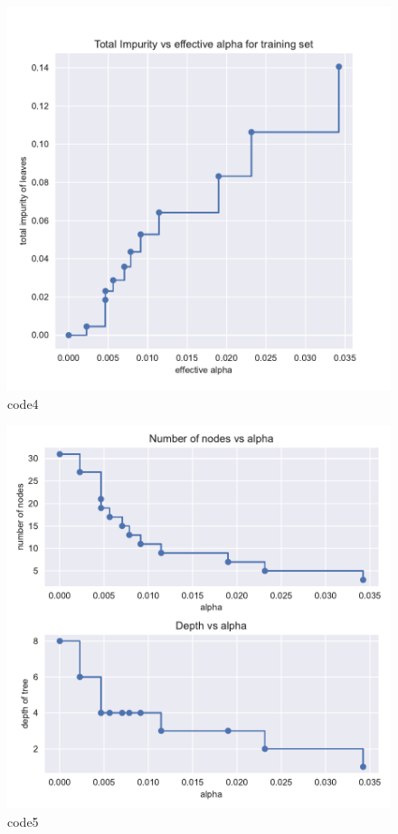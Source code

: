 \begin{PythonCode}\label{例4}
	
\end{PythonCode}

\begin{figure}[htbp]
	\centering
	\includegraphics[width=14cm]{codeimage/code4}
	\caption{code4}
	\label{code4}
\end{figure}

\begin{figure}[htbp]
	\centering
	\includegraphics[width=14cm]{codeimage/code5}
	\caption{code5}
	\label{code5}
\end{figure}

